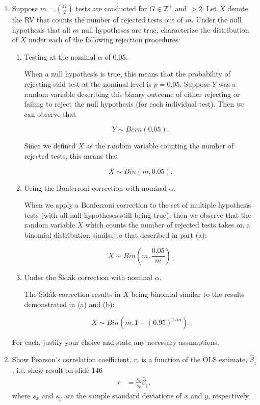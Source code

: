 \documentclass{article}
\begin{document}
	\begin{enumerate}
		\item Suppose $m = {G \choose 2}$ tests are conducted for $G \in \mathbb{Z}^{+}$ and $> 2$. Let $X$ denote the RV that counts the number of rejected tests out of $m$. Under the null hypothesis that all $m$ null hypotheses are true, characterize the distribution of $X$ under each of the following rejection procedures:
		\begin{enumerate}
			\item Testing at the nominal $\alpha$ of 0.05.

			When a null hypothesis is true, this means that the probability of rejecting said test at the nominal level is $p = 0.05$. Suppose $Y$ was a random variable describing this binary outcome of either rejecting or failing to reject the null hypothesis (for each individual test). Then we can observe that
			
			$$Y \sim Bern(0.05).$$

			Since we defined $X$ as the random variable counting the number of rejected tests, this means that

			$$X \sim Bin(m, 0.05).$$

			\item Using the Bonferroni correction with nominal $\alpha$.
			
			When we apply a Bonferroni correction to the set of multiple hypothesis tests (with all null hypotheses still being true), then we observe that the random variable $X$ which counts the number of rejected tests takes on a binomial distribution similar to that described in part (a):

			$$X \sim Bin(m, \frac{0.05}{m}).$$

			\item Under the \v{S}id\'ak correction with nominal $\alpha$.
			
			The \v{S}id\'ak correction results in $X$ being binomial similar to the results demonstrated in (a) and (b):

			$$X \sim Bin(m, 1 - (0.95)^{1/m}).$$
			
		\end{enumerate}
		For each, justify your choice and state any necessary assumptions.
		

		\newpage
		\item Show Pearson's correlation coefficient, $r$, is a function of the OLS estimate, $\hat{\beta}_1$, i.e. show result on slide 146
		\begin{align*}
			r &= \frac{s_x}{s_y}\hat{\beta}_1,
		\end{align*}
		where $s_x$ and $s_y$ are the sample standard deviations of $x$ and $y$, respectively.


\end{enumerate}
\end{document}
